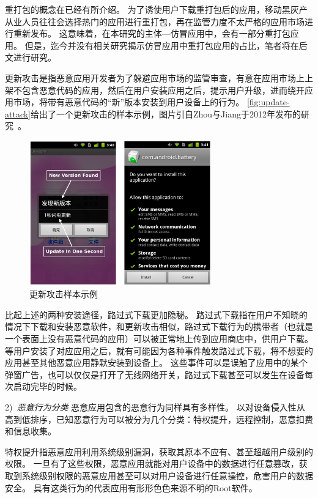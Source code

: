 重打包的概念在已经有所介绍。
为了诱使用户下载重打包后的应用，移动黑灰产从业人员往往会选择热门的应用进行重打包，再在监管力度不太严格的应用市场进行重新发布。
这意味着，在本研究的主体---仿冒应用中，会有一部分重打包应用。
但是，迄今并没有相关研究揭示仿冒应用中重打包应用的占比，笔者将在后文进行研究。

更新攻击是指恶意应用开发者为了躲避应用市场的监管审查，有意在应用市场上上架不包含恶意代码的应用，然后在用户安装应用之后，提示用户升级，进而绕开应用市场，将带有恶意代码的``新''版本安装到用户设备上的行为。
\autoref{fig:update-attack}给出了一个更新攻击的样本示例，图片引自Zhou与Jiang于2012年发布的研究~\cite{Zhou2012DissectingAM}。

\begin{figure}[h]
	\centering
	\includegraphics[width=0.7\textwidth]{./Figures/edwin-update-attack}
	\caption{更新攻击样本示例}
	\label{fig:update-attack}
	\vspace{-5mm}
\end{figure}

比起上述的两种安装途径，路过式下载更加隐秘。
路过式下载指在用户不知晓的情况下下载和安装恶意软件，和更新攻击相似，路过式下载行为的携带者（也就是一个表面上没有恶意代码的应用）可以被正常地上传到应用商店中，供用户下载。
等用户安装了对应应用之后，就有可能因为各种事件触发路过式下载，将不想要的应用甚至其他恶意应用静默安装到设备上。
这些事件可以是误触了应用中的某个弹窗广告，也可以仅仅是打开了无线网络开关，路过式下载甚至可以发生在设备每次启动完毕的时候。

2)\ \emph{恶意行为分类} \quad
恶意应用包含的恶意行为同样具有多样性。
以对设备侵入性从高到低排序，已知恶意行为可以被分为几个分类：特权提升，远程控制，恶意扣费和信息收集。

特权提升指恶意应用利用系统级别漏洞，获取其原本不应有、甚至超越用户级别的权限。
一旦有了这些权限，恶意应用就能对用户设备中的数据进行任意篡改，获取到系统级别权限的恶意应用甚至可以对用户设备进行任意操控，危害用户的数据安全。
具有这类行为的代表应用有形形色色来源不明的Root软件。

